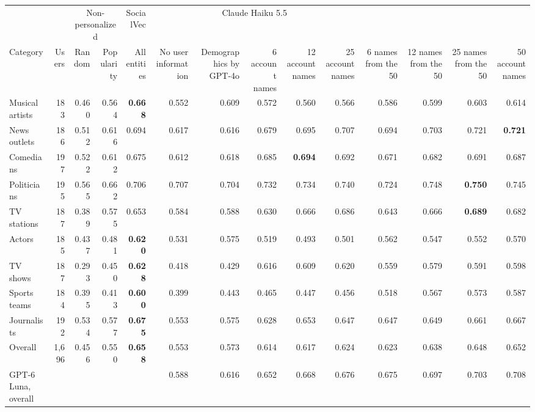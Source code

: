 \begin{tabular}{lrrrrrrrrrrrrr}
\toprule
 &  & \multicolumn{2}{c}{Non-personalized} & SocialVec & \multicolumn{5}{c}{Claude Haiku 5.5} \\
Category & Users & Random & Popularity & All entities & No user information & Demographics by GPT-4o & 6 account names & 12 account names & 25 account names & 6 names from the 50 & 12 names from the 50 & 25 names from the 50 & 50 account names \\
\midrule
Musical artists & 183 & 0.460 & 0.564 & \textbf{0.668} & 0.552 & 0.609 & 0.572 & 0.560 & 0.566 & 0.586 & 0.599 & 0.603 & 0.614 \\
News outlets & 186 & 0.512 & 0.616 & 0.694 & 0.617 & 0.616 & 0.679 & 0.695 & 0.707 & 0.694 & 0.703 & 0.721 & \textbf{0.721} \\
Comedians & 197 & 0.522 & 0.612 & 0.675 & 0.612 & 0.618 & 0.685 & \textbf{0.694} & 0.692 & 0.671 & 0.682 & 0.691 & 0.687 \\
Politicians & 195 & 0.565 & 0.662 & 0.706 & 0.707 & 0.704 & 0.732 & 0.734 & 0.740 & 0.724 & 0.748 & \textbf{0.750} & 0.745 \\
TV stations & 187 & 0.389 & 0.575 & 0.653 & 0.584 & 0.588 & 0.630 & 0.666 & 0.686 & 0.643 & 0.666 & \textbf{0.689} & 0.682 \\
Actors & 185 & 0.437 & 0.481 & \textbf{0.620} & 0.531 & 0.575 & 0.519 & 0.493 & 0.501 & 0.562 & 0.547 & 0.552 & 0.570 \\
TV shows & 187 & 0.293 & 0.450 & \textbf{0.628} & 0.418 & 0.429 & 0.616 & 0.609 & 0.620 & 0.559 & 0.579 & 0.591 & 0.598 \\
Sports teams & 184 & 0.395 & 0.413 & \textbf{0.600} & 0.399 & 0.443 & 0.465 & 0.447 & 0.456 & 0.518 & 0.567 & 0.573 & 0.587 \\
Journalists & 192 & 0.534 & 0.577 & \textbf{0.675} & 0.553 & 0.575 & 0.628 & 0.653 & 0.647 & 0.647 & 0.649 & 0.661 & 0.667 \\
\midrule
Overall & 1,696 & 0.456 & 0.550 & \textbf{0.658} & 0.553 & 0.573 & 0.614 & 0.617 & 0.624 & 0.623 & 0.638 & 0.648 & 0.652 \\
GPT-6 Luna, overall &  &  &  &  & 0.588 & 0.616 & 0.652 & 0.668 & 0.676 & 0.675 & 0.697 & 0.703 & 0.708 \\
\bottomrule
\end{tabular}
